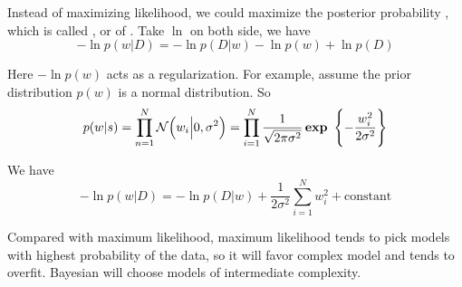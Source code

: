 Instead of maximizing likelihood, we could maximize the posterior probability , which is called , or  of . Take $\ln$ on both side, we have
\begin{equation}
    -\ln p(w|D) = -\ln p(D|w) - \ln p(w) + \ln p(D)
\end{equation}

Here $-\ln p(w)$ acts as a regularization. For example, assume the prior distribution $p(w)$ is a normal distribution. So
\begin{equation}
    p(w|s) = \prod_{n=1}^N \normaldistributionwithparameter{w_i}{0}{\sigma^2} = \prod_{i=1}^N \frac{1}{\sqrt{2\pi \sigma^2}} \exponential{- \frac{w_i^2}{2 \sigma^2}}
\end{equation}

We have
\begin{equation}
    -\ln p(w|D) = -\ln p(D|w) + \frac{1}{2\sigma^2}\sum_{i=1}^N w_i^2 + \text{constant}
\end{equation}


Compared with maximum likelihood, maximum likelihood tends to pick models with highest probability of the data, so it will favor complex model and tends to overfit. Bayesian will choose models of intermediate complexity.

